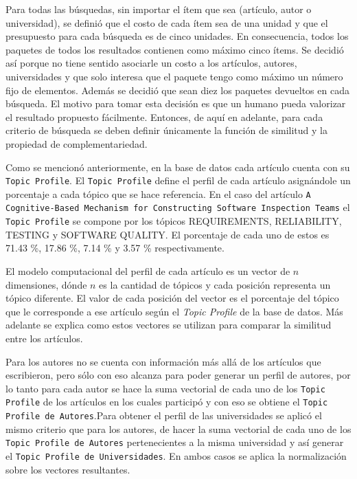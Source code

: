 Para todas las búsquedas, sin importar el ítem que sea (artículo, autor o universidad), se definió que el costo de cada ítem sea de una unidad y que el presupuesto para cada búsqueda es de cinco unidades. En consecuencia, todos los paquetes de todos los resultados contienen como máximo cinco ítems. Se decidió así porque no tiene sentido asociarle un costo a los artículos, autores, universidades y que solo interesa que el paquete tengo como máximo un número fijo de elementos. Además se decidió que sean diez los paquetes devueltos en cada búsqueda. El motivo para tomar esta decisión es que un humano pueda valorizar el resultado propuesto fácilmente. Entonces, de aquí en adelante, para cada criterio de búsqueda se deben definir únicamente la función de similitud y la propiedad de complementariedad.

Como se mencionó anteriormente, en la base de datos cada artículo cuenta con su \texttt{Topic Profile}. El \texttt{Topic Profile} define el perfil de cada artículo asignándole un porcentaje a cada tópico que se hace referencia. En el caso del artículo \texttt{A Cognitive-Based Mechanism for Constructing Software Inspection Teams} el \texttt{Topic Profile} se compone por los tópicos  REQUIREMENTS, RELIABILITY, TESTING y SOFTWARE QUALITY. El porcentaje de cada uno de estos es 71.43 \%, 17.86 \%, 7.14 \% y 3.57 \% respectivamente.

El modelo computacional del perfil de cada artículo es un vector de $n$ dimensiones, dónde $n$ es la cantidad de tópicos y cada posición representa un tópico diferente. El valor de cada posición del vector es el porcentaje del tópico que le corresponde a ese artículo según el \textit{Topic Profile} de la base de datos. Más adelante se explica como estos vectores se utilizan para comparar la similitud entre los artículos.

Para los autores no se cuenta con información más allá de los artículos que escribieron, pero sólo con eso alcanza para poder generar un perfil de autores, por lo tanto para cada autor se hace la suma vectorial de cada uno de los \texttt{Topic Profile} de los artículos en los cuales participó y con eso se obtiene el \texttt{Topic Profile de Autores}.Para obtener el perfil de las universidades se aplicó el mismo criterio que para los autores, de hacer la suma vectorial de cada uno de los \texttt{Topic Profile de Autores} pertenecientes a la misma universidad y así generar el \texttt{Topic Profile de Universidades}. En ambos casos se aplica la normalización sobre los vectores resultantes.

